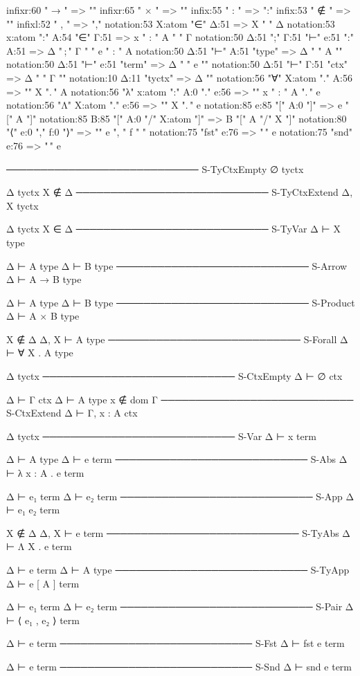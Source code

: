 \documentclass{article}
\begin{document}
\begin{inference-notation}
infixr:60 " → " => "\to"
infixr:65 " × " => "\times"
infix:55  " : " => ":"
infix:53  " ∉ " => "\notin"
infixl:52 " , " => ","
notation:53 X:atom "∈" Δ:51 => X " \in " Δ
notation:53 x:atom ":" A:54 "∈" Γ:51 => x " : " A " \in " Γ
notation:50 Δ:51 ";" Γ:51 "⊢" e:51 ":" A:51 => Δ "\,;\," Γ " \vdash " e " : " A
notation:50 Δ:51 "⊢" A:51 "type" => Δ " \vdash " A "\;"
notation:50 Δ:51 "⊢" e:51 "term" => Δ " \vdash " e "\;"
notation:50 Δ:51 "⊢" Γ:51 "ctx" => Δ " \vdash " Γ "\;"
notation:10 Δ:11 "tyctx" => Δ "\;"
notation:56 "∀" X:atom "." A:56 => "\forall " X ".\," A
notation:56 "λ" x:atom ":" A:0 "." e:56 => "\lambda " x " : " A ".\," e
notation:56 "Λ" X:atom "." e:56 => "\Lambda " X ".\," e
notation:85 e:85 "[" A:0 "]" => e "[" A "]"
notation:85 B:85 "[" A:0 "/" X:atom "]" => B "[" A "/" X "]"
notation:80 "⟨" e:0 "," f:0 "⟩" => "\langle " e ", " f " \rangle"
notation:75 "fst" e:76 => "\," e
notation:75 "snd" e:76 => "\," e
\end{inference-notation}

\begin{inference}[rule_set=System F type and context formation]
──────────────────────────── S-TyCtxEmpty
∅ tyctx

Δ tyctx
X ∉ Δ
──────────────────────────── S-TyCtxExtend
Δ, X tyctx

Δ tyctx
X ∈ Δ
──────────────────────────── S-TyVar
Δ ⊢ X type

Δ ⊢ A type
Δ ⊢ B type
──────────────────────────── S-Arrow
Δ ⊢ A → B type

Δ ⊢ A type
Δ ⊢ B type
──────────────────────────── S-Product
Δ ⊢ A × B type

X ∉ Δ
Δ, X ⊢ A type
──────────────────────────── S-Forall
Δ ⊢ ∀ X . A type

Δ tyctx
──────────────────────────── S-CtxEmpty
Δ ⊢ ∅ ctx

Δ ⊢ Γ ctx
Δ ⊢ A type
x ∉ dom Γ
──────────────────────────── S-CtxExtend
Δ ⊢ Γ, x : A ctx
\end{inference}

\begin{inference}[rule_set=System F term formation]
Δ tyctx
──────────────────────────── S-Var
Δ ⊢ x term

Δ ⊢ A type
Δ ⊢ e term
──────────────────────────── S-Abs
Δ ⊢ λ x : A . e term

Δ ⊢ e₁ term
Δ ⊢ e₂ term
──────────────────────────── S-App
Δ ⊢ e₁ e₂ term

X ∉ Δ
Δ, X ⊢ e term
──────────────────────────── S-TyAbs
Δ ⊢ Λ X . e term

Δ ⊢ e term
Δ ⊢ A type
──────────────────────────── S-TyApp
Δ ⊢ e [ A ] term

Δ ⊢ e₁ term
Δ ⊢ e₂ term
──────────────────────────── S-Pair
Δ ⊢ ⟨ e₁ , e₂ ⟩ term

Δ ⊢ e term
──────────────────────────── S-Fst
Δ ⊢ fst e term

Δ ⊢ e term
──────────────────────────── S-Snd
Δ ⊢ snd e term
\end{inference}
\end{document}
